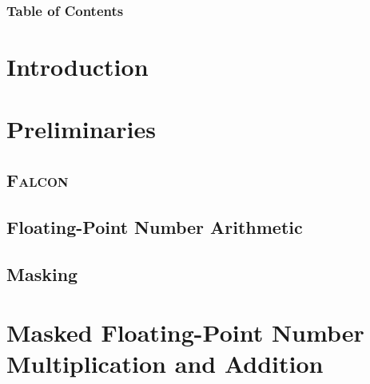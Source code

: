 

\usepackage[
    backend=biber,
    style=alphabetic,
    sorting=ynt
]{biblatex}


\renewcommand*{\bibfont}{\scriptsize}





\begin{frame}
\maketitle
\end{frame}



\begin{frame}
\frametitle{Table of Contents}
\tableofcontents[hideothersubsections]

\end{frame}


\section{Introduction}




\section{Preliminaries}

\subsection{\textsc{Falcon}}


\subsection{Floating-Point Number Arithmetic}


\subsection{Masking}

%

\section{Masked Floating-Point Number Multiplication and Addition}
